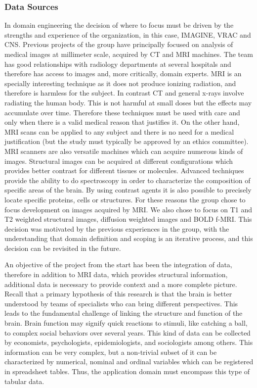 \subsubsection{Data Sources}

In domain engineering the decision of where to focus must be driven by the strengths and experience of the organization, in this case, IMAGINE, VRAC and CNS. Previous projects of the group have principally focused on analysis of medical images at millimeter scale, acquired by CT and MRI machines. The team has good relationships with radiology departments at several hospitals and therefore has access to images and, more critically, domain experts. MRI is an specially interesting technique as it does not produce ionizing radiation, and therefore is harmless for the subject. In contrast CT and general x-rays involve radiating the human body. This is not harmful at small doses but the effects may accumulate over time. Therefore these techniques must be used with care and only when there is a valid medical reason that justifies it. On the other hand, MRI scans can be applied to any subject and there is no need for a medical justification (but the study must typically be approved by an ethics committee). MRI scanners are also versatile machines which can acquire numerous kinds of images. Structural images can be acquired at different configurations which provides better contrast for different tissues or molecules. Advanced techniques provide the ability to do spectroscopy in order to characterize the composition of specific areas of the brain. By using contrast agents it is also possible to precisely locate specific proteins, cells or structures. 
For these reasons the group chose to focus development on images acquired by MRI. We also chose to focus on T1 and T2 weighted structural images, diffusion weighted images and BOLD f-MRI. This decision was motivated by the previous experiences in the group, with the understanding that domain definition and scoping is an iterative process, and this decision can be revisited in the future.

An objective of the project from the start has been the integration of data, therefore in addition to MRI data, which provides structural information, additional data is necessary to provide context and a more complete picture. Recall that a primary  hypothesis of this research is that the brain is better understood by teams of specialists who can bring different perspectives. This leads to the fundamental  challenge of linking the structure and function of the brain. Brain function may signify quick reactions to stimuli, like catching a ball, to complex social behaviors over several years. This kind of data can be collected by economists, psychologists, epidemiologists, and sociologists among others. This information can be very complex, but a non-trivial subset of it can be characterized by numerical, nominal and ordinal variables which can be registered in spreadsheet tables. Thus, the application domain must encompass this type of tabular data. 

